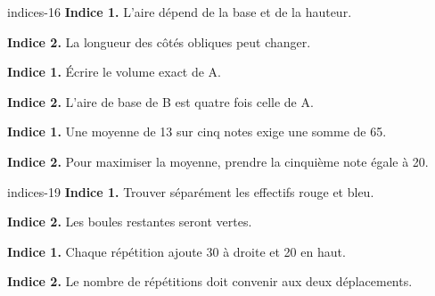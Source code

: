 \begin{blocEdition}{indices-16}
\textbf{Indice 1.} L’aire dépend de la base et de la hauteur.\par\medskip\textbf{Indice 2.} La longueur des côtés obliques peut changer.\par
{}\textbf{Indice 1.} Écrire le volume exact de A.\par\medskip\textbf{Indice 2.} L’aire de base de B est quatre fois celle de A.\par
{}\textbf{Indice 1.} Une moyenne de 13 sur cinq notes exige une somme de 65.\par\medskip\textbf{Indice 2.} Pour maximiser la moyenne, prendre la cinquième note égale à 20.\par

\end{blocEdition}
\begin{blocEdition}{indices-19}
\textbf{Indice 1.} Trouver séparément les effectifs rouge et bleu.\par\medskip\textbf{Indice 2.} Les boules restantes seront vertes.\par
{}\textbf{Indice 1.} Chaque répétition ajoute 30 à droite et 20 en haut.\par\medskip\textbf{Indice 2.} Le nombre de répétitions doit convenir aux deux déplacements.\par

\end{blocEdition}
